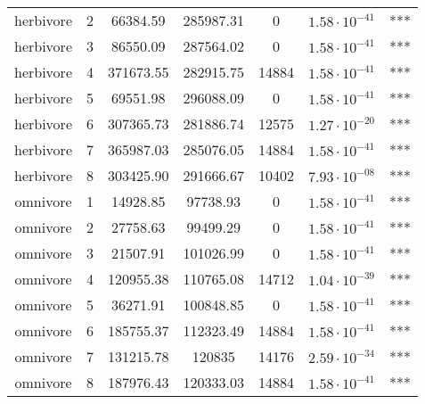 \begin{table}[ht!]
\begin{tabular*}{\textwidth}{@{\extracolsep{\fill} }ccccccc}
  herbivore & 2 & 66384.59 & 285987.31 & 0 & $1.58\cdot 10^{-41}$ & *** \\ 
  herbivore & 3 & 86550.09 & 287564.02 & 0 & $1.58\cdot 10^{-41}$ & *** \\ 
  herbivore & 4 & 371673.55 & 282915.75 & 14884 & $1.58\cdot 10^{-41}$ & *** \\ 
  herbivore & 5 & 69551.98 & 296088.09 & 0 & $1.58\cdot 10^{-41}$ & *** \\ 
  herbivore & 6 & 307365.73 & 281886.74 & 12575 & $1.27\cdot 10^{-20}$ & *** \\ 
  herbivore & 7 & 365987.03 & 285076.05 & 14884 & $1.58\cdot 10^{-41}$ & *** \\ 
  herbivore & 8 & 303425.90 & 291666.67 & 10402 & $7.93\cdot 10^{-08}$ & *** \\ 
   [1ex]omnivore & 1 & 14928.85 & 97738.93 & 0 & $1.58\cdot 10^{-41}$ & *** \\ 
  omnivore & 2 & 27758.63 & 99499.29 & 0 & $1.58\cdot 10^{-41}$ & *** \\ 
  omnivore & 3 & 21507.91 & 101026.99 & 0 & $1.58\cdot 10^{-41}$ & *** \\ 
  omnivore & 4 & 120955.38 & 110765.08 & 14712 & $1.04\cdot 10^{-39}$ & *** \\ 
  omnivore & 5 & 36271.91 & 100848.85 & 0 & $1.58\cdot 10^{-41}$ & *** \\ 
  omnivore & 6 & 185755.37 & 112323.49 & 14884 & $1.58\cdot 10^{-41}$ & *** \\ 
  omnivore & 7 & 131215.78 & 120835 & 14176 & $2.59\cdot 10^{-34}$ & *** \\ 
  omnivore & 8 & 187976.43 & 120333.03 & 14884 & $1.58\cdot 10^{-41}$ & *** \\ 
   \bottomrule
\end{tabular*}
\end{table}
